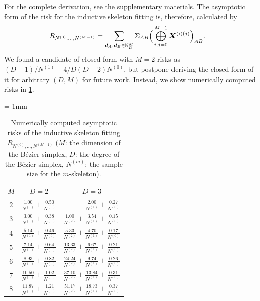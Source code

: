 \documentclass[letterpaper]{article} %
\theoremstyle{plain}
\newcommand{\N}{\mathbb{N}}
\newcommand{\ZZ}{\Sigma}
\begin{document}
For the complete derivation, see the supplementary materials.
The asymptotic form of the risk for the inductive skeleton fitting is, therefore, calculated by
\begin{align}
    &R_{N^{(0)}, \dots, N^{(M - 1)}}
    =
    \sum_{\bm d_A, \bm d_B \in \N_D^M}
    \ZZ_{AB}
    \Big(
    \bigoplus_{i, j = 0}^{M - 1}
    \bm X^{(i)(j)}
    \Big)_{AB}
    \notag
    .
\end{align}
We found a candidate of closed-form with $M = 2$ risks as $(D - 1) / N^{(1)} + 4 / D(D + 2)N^{(0)}$, but postpone deriving the closed-form of it for arbitrary $(D, M)$ for future work.
Instead, we show numerically computed risks in \cref{tab:risk-inductive}.

\begin{table}[ht]
    \centering
    \footnotesize
    \caption{Numerically computed asymptotic risks of the inductive skeleton fitting $R_{N^{(0)}, \dots, N^{(M - 1)}}$ ($M$: the dimension of the B\'ezier simplex, $D$: the degree of the B\'ezier simplex, $N^{(m)}$: the sample size for the $m$-skeleton).}\label{tab:risk-inductive}
    {\tabcolsep = 1mm
    \begin{tabular}{crr}
    \toprule
    $M$ &
    \multicolumn{1}{c}{$D = 2$} &
    \multicolumn{1}{c}{$D = 3$}
    \\
    \midrule
    $2$ &
    $\displaystyle\frac{1.00}{N^{(1)}} + \frac{0.50}{N^{(0)}}$ &
    $\displaystyle\frac{2.00}{N^{(1)}} + \frac{0.27}{N^{(0)}}$
    \\[6pt]
    $3$ &
    $\displaystyle\frac{3.00}{N^{(1)}} + \frac{0.38}{N^{(0)}}$ &
    $\displaystyle\frac{1.00}{N^{(2)}} + \frac{3.54}{N^{(1)}} + \frac{0.15}{N^{(0)}}$
    \\[6pt]
    $4$ &
    $\displaystyle\frac{5.14}{N^{(1)}} + \frac{0.46}{N^{(0)}}$ &
    $\displaystyle\frac{5.33}{N^{(2)}} + \frac{4.70}{N^{(1)}} + \frac{0.17}{N^{(0)}}$
    \\[6pt]
    $5$ &
    $\displaystyle\frac{7.14}{N^{(1)}} + \frac{0.64}{N^{(0)}}$ &
    $\displaystyle\frac{13.33}{N^{(2)}} + \frac{6.67}{N^{(1)}} + \frac{0.21}{N^{(0)}}$
    \\[6pt]
    $6$ &
    $\displaystyle\frac{8.93}{N^{(1)}} + \frac{0.82}{N^{(0)}}$ &
    $\displaystyle\frac{24.24}{N^{(2)}} + \frac{9.74}{N^{(1)}} + \frac{0.26}{N^{(0)}}$
    \\[6pt]
    $7$ &
    $\displaystyle\frac{10.50}{N^{(1)}} + \frac{1.02}{N^{(0)}}$ &
    $\displaystyle\frac{37.10}{N^{(2)}} + \frac{13.84}{N^{(1)}} + \frac{0.31}{N^{(0)}}$
    \\[6pt]
    $8$ &
    $\displaystyle\frac{11.87}{N^{(1)}} + \frac{1.21}{N^{(0)}}$ &
    $\displaystyle\frac{51.17}{N^{(2)}} + \frac{18.73}{N^{(1)}} + \frac{0.37}{N^{(0)}}$
    \\
    \bottomrule
    \end{tabular}
    }
\end{table}
\end{document}
